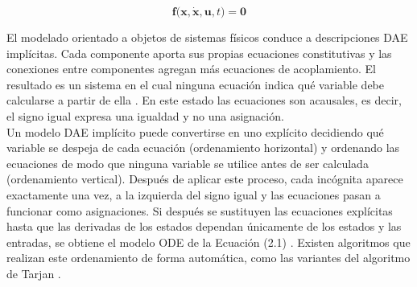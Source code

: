 \begin{equation}
	\mathbf{f}\bigl(\mathbf{x}, \dot{\mathbf{x}}, \mathbf{u}, t\bigr) = \mathbf{0}
	\label{eq:implicit_dae}
\end{equation}

El modelado orientado a objetos de sistemas físicos conduce a descripciones DAE implícitas. Cada componente aporta sus propias ecuaciones constitutivas y las conexiones entre componentes agregan más ecuaciones de acoplamiento. El resultado es un sistema en el cual ninguna ecuación indica qué variable debe calcularse a partir de ella \cite{cellier2006}. En este estado las ecuaciones son acausales, es decir, el signo igual expresa una igualdad y no una asignación. \\



Un modelo DAE implícito puede convertirse en uno explícito decidiendo qué variable se despeja de cada ecuación (ordenamiento horizontal) y ordenando las ecuaciones de modo que ninguna variable se utilice antes de ser calculada (ordenamiento vertical). Después de aplicar este proceso, cada incógnita aparece exactamente una vez, a la izquierda del signo igual y las ecuaciones pasan a funcionar como asignaciones. Si después se sustituyen las ecuaciones explícitas hasta que las derivadas de los estados dependan únicamente de los estados y las entradas, se obtiene el modelo ODE de la Ecuación (2.1) \cite{cellier2006}. Existen algoritmos que realizan este ordenamiento de forma automática, como las variantes del algoritmo de Tarjan \cite{cellier2006}. \\

